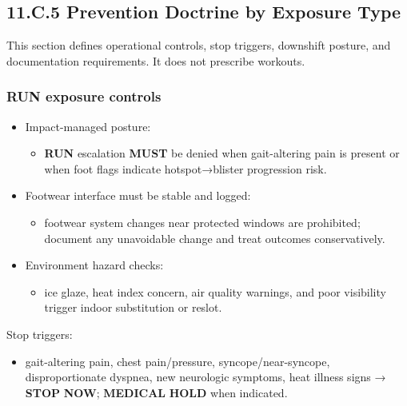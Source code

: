 \documentclass[10pt]{article}
\begin{document}
\endgroup

\newpage

\subsection*{11.C.5 Prevention Doctrine by Exposure Type}
{}

This section defines operational controls, stop triggers, downshift posture, and documentation requirements. It does not prescribe workouts.

\subsubsection*{\textbf{RUN} exposure controls}

\begin{itemize}
\item Impact-managed posture:
\begin{itemize}
\item \textbf{RUN} escalation \textbf{MUST} be denied when gait-altering pain is present or when foot flags indicate hotspot→blister progression risk.
\end{itemize}
\item Footwear interface must be stable and logged:
\begin{itemize}
\item footwear system changes near protected windows are prohibited; document any unavoidable change and treat outcomes conservatively.
\end{itemize}
\item Environment hazard checks:
\begin{itemize}
\item ice glaze, heat index concern, air quality warnings, and poor visibility trigger indoor substitution or reslot.
\end{itemize}
\end{itemize}

Stop triggers:

\begin{itemize}
\item gait-altering pain, chest pain/pressure, syncope/near-syncope, disproportionate dyspnea, new neurologic symptoms, heat illness signs → \textbf{STOP} \textbf{NOW}; \textbf{MEDICAL} \textbf{HOLD} when indicated.
\end{itemize}
\end{document}
